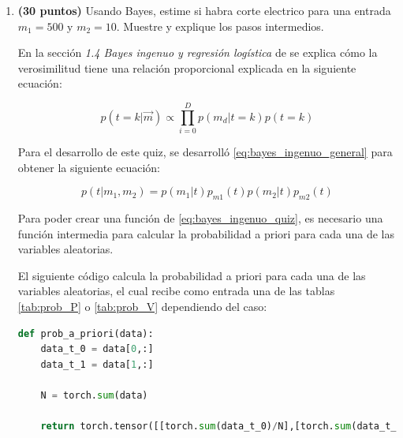 \documentclass[spanish,english]{article}
\begin{document}
\begin{enumerate}
\begin{lstlisting}[language=Python]
# Probabilidades para p(m=1|t=0)
p_m2_t0 = gauss_model(bins,p_m2_t0_mean,p_m2_t0_std)
prob_V[0,:] = p_m2_t0

# Probabilidades para p(m=1|t=0)
p_m2_t1 = exp_model(bins,p_m2_t1_lambda)
prob_V[1,:] = p_m2_t1

# Imprimiendo los resultados
print("Probabilidad de p=m1:\n", prob_P)
print("Probabilidad de v=m2:\n", prob_V)
\end{lstlisting}

\item \textbf{(30 puntos)} Usando Bayes, estime si habra corte electrico
para una entrada $m_{1}=500$ y $m_{2}=10$. Muestre y explique los
pasos intermedios.%

En la secci\'{o}n \textit{1.4 Bayes ingenuo y regresi\'{o}n log\'{i}stica} de \cite{Calderon_Clasificacion_Binaria} se explica c\'{o}mo la verosimilitud tiene una relaci\'{o}n proporcional explicada en la siguiente ecuaci\'{o}n:

\begin{equation}\label{eq:bayes_ingenuo_general}
p\left(t=k|\overrightarrow{m}\right)\propto\prod_{i=0}^{D}p\left(m_{d}|t=k\right)p\left(t=k\right)
\end{equation}

Para el desarrollo de este quiz, se desarroll\'{o} \ref{eq:bayes_ingenuo_general} para obtener la siguiente ecuaci\'{o}n:

\begin{equation}\label{eq:bayes_ingenuo_quiz}
p\left(t|m_{1},m_{2}\right) = p\left(m_{1}|t\right)p_{m1}\left(t\right)p\left(m_{2}|t\right)p_{m2}\left(t\right)
\end{equation}

Para poder crear una funci\'{o}n de \ref{eq:bayes_ingenuo_quiz}, es necesario una funci\'{o}n intermedia para calcular la probabilidad a priori para cada una de las variables aleatorias.

El siguiente c\'{o}digo calcula la probabilidad a priori para cada una de las variables aleatorias, el cual recibe como entrada una de las tablas \ref{tab:prob_P} o \ref{tab:prob_V} dependiendo del caso:

\begin{lstlisting}[language=Python]
def prob_a_priori(data):
    data_t_0 = data[0,:]
    data_t_1 = data[1,:]
    
    N = torch.sum(data)
    
    return torch.tensor([[torch.sum(data_t_0)/N],[torch.sum(data_t_1)/N]])
\end{lstlisting}


\end{enumerate}
\end{document}
